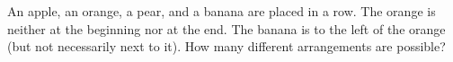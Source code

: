 An apple, an orange, a pear, and a banana are placed in a row. The orange is neither at the beginning nor at the end. The banana is to the left of the orange (but not necessarily next to it). How many different arrangements are possible?
